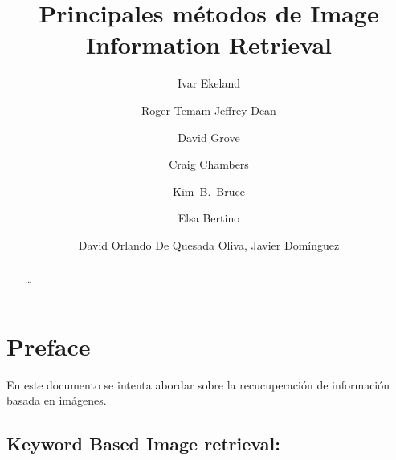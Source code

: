 \documentclass{llncs}
\begin{document}
\frontmatter          %
%

%
\chapter*{Preface}
%
En este documento se intenta abordar sobre la recucuperación de información basada en imágenes.


\tableofcontents
%
\mainmatter              %
%
\title{Principales m\'etodos de Image Information Retrieval}
%
\titlerunning{}  %
%
\author{Ivar Ekeland \and Roger Temam
Jeffrey Dean \and David Grove \and Craig Chambers \and Kim~B.~Bruce \and
Elsa Bertino}

%
\author{David Orlando De Quesada Oliva, Javier Dom\'inguez}
%
%
%
\begin{abstract}
    \dots
   \keywords{}
   \end{abstract}


\maketitle

\section{Keyword Based Image retrieval:}
\end{document}
